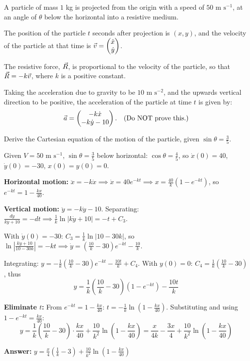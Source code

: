 \begin{problem}
A particle of mass $1$ kg is projected from the origin with a speed of $50 \text{ m s}^{-1}$, at an angle of $\theta$ below the horizontal into a resistive medium.

The position of the particle $t$ seconds after projection is $(x, y)$, and the velocity of the particle at that time is $\vec{v} = \begin{pmatrix} \dot{x} \\ \dot{y} \end{pmatrix}$.

The resistive force, $\vec{R}$, is proportional to the velocity of the particle, so that $\vec{R} = -k\vec{v}$, where $k$ is a positive constant.

Taking the acceleration due to gravity to be $10 \text{ m s}^{-2}$, and the upwards vertical direction to be positive, the acceleration of the particle at time $t$ is given by:
$$
\vec{a} = \begin{pmatrix} -k\dot{x} \\ -k\dot{y} - 10 \end{pmatrix}. \quad (\text{Do NOT prove this.})
$$

Derive the Cartesian equation of the motion of the particle, given $\sin \theta = \frac{3}{5}$.
\end{problem}

\begin{solution}
Given $V = 50 \text{ m s}^{-1}$, $\sin\theta = \frac{3}{5}$ below horizontal: $\cos\theta = \frac{4}{5}$, so $\dot{x}(0) = 40$, $\dot{y}(0) = -30$, $x(0)=y(0)=0$.

\textbf{Horizontal motion:} $\ddot{x} = -k\dot{x} \implies \dot{x} = 40e^{-kt} \implies x = \frac{40}{k}(1-e^{-kt})$, so $e^{-kt} = 1 - \frac{kx}{40}$.

\textbf{Vertical motion:} $\ddot{y} = -k\dot{y} - 10$. Separating: $\frac{d\dot{y}}{k\dot{y}+10} = -dt \implies \frac{1}{k}\ln|k\dot{y}+10| = -t + C_3$.

With $\dot{y}(0)=-30$: $C_3 = \frac{1}{k}\ln|10-30k|$, so $\ln\left|\frac{k\dot{y}+10}{10-30k}\right| = -kt \implies \dot{y} = \left(\frac{10}{k}-30\right)e^{-kt} - \frac{10}{k}$.

Integrating: $y = -\frac{1}{k}\left(\frac{10}{k}-30\right)e^{-kt} - \frac{10t}{k} + C_4$. With $y(0)=0$: $C_4 = \frac{1}{k}\left(\frac{10}{k}-30\right)$, thus
\[
y = \frac{1}{k}\left(\frac{10}{k}-30\right)(1-e^{-kt}) - \frac{10t}{k}
\]

\textbf{Eliminate $t$:} From $e^{-kt} = 1-\frac{kx}{40}$: $t = -\frac{1}{k}\ln\left(1-\frac{kx}{40}\right)$. Substituting and using $1-e^{-kt} = \frac{kx}{40}$:
\[
y = \frac{1}{k}\left(\frac{10}{k}-30\right) \cdot \frac{kx}{40} + \frac{10}{k^2}\ln\left(1-\frac{kx}{40}\right) = \frac{x}{4k} - \frac{3x}{4} + \frac{10}{k^2}\ln\left(1-\frac{kx}{40}\right)
\]

\textbf{Answer:} $\boxed{y = \frac{x}{4}\left(\frac{1}{k} - 3\right) + \frac{10}{k^2}\ln\left(1 - \frac{kx}{40}\right)}$
\end{solution}

